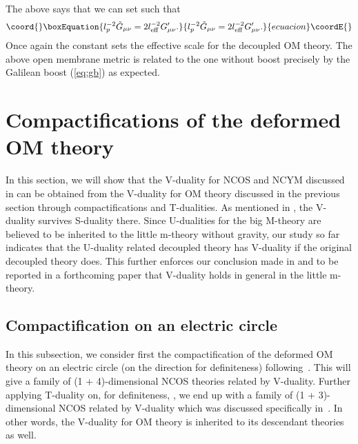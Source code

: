 \documentclass[a4paper,12pt]{article}
\providecommand{\sect}[1]{\setcounter{equation}{0}\section{#1}}
\begin{document}
The above \coordHE{} says that we can set \coordHE{} such
that
\begin{equation}\coord{}\boxEquation{
\label{3eq12}
l_p^{-2} \tilde{G}_{\mu\nu}= 2 l^{-2}_{\rm eff} G'_{\mu\nu}.
}{
l_p^{-2} \tilde{G}_{\mu\nu}= 2 l^{-2}_{\rm eff} G'_{\mu\nu}.
}{ecuacion}\coordE{}\end{equation}
Once again the constant \coordHE{} sets the effective scale for 
 the decoupled
OM theory. The above open membrane metric \coordHE{} is
 related to the one without boost precisely by the Galilean boost
(\ref{eq:gb}) as expected.

\sect{Compactifications of the deformed OM theory}

	In this section, we will show that the V-duality for NCOS and
NCYM discussed in \cite{CW,CLW} can be obtained from the V-duality for OM
theory discussed in the previous section through compactifications and 
T-dualities. As mentioned in \cite{CLW}, the V-duality survives
S-duality there. Since U-dualities for the big M-theory are believed to 
be inherited to the little m-theory without gravity, our study so far
indicates that the U-duality related decoupled theory has V-duality if
the original decoupled theory does. This further enforces our conclusion
made in \cite{CLW} and to be reported in a forthcoming paper
\cite{clwone} that V-duality holds in general in the little
m-theory.

\subsection{Compactification on an electric circle}

In this subsection, we consider first the compactification of the
deformed OM theory on an electric circle (on the direction \coordHE{}
for definiteness) following~\cite{Gop2}. This will
give a family of (1 + 4)-dimensional NCOS theories related by V-duality.
Further applying T-duality on, for definiteness, \coordHE{}, we end up
with a family of (1 + 3)-dimensional NCOS related by V-duality which was
discussed specifically in~\cite{CW,CLW}. In other words, the V-duality for
OM theory is inherited to its descendant theories as well.
\end{document}
